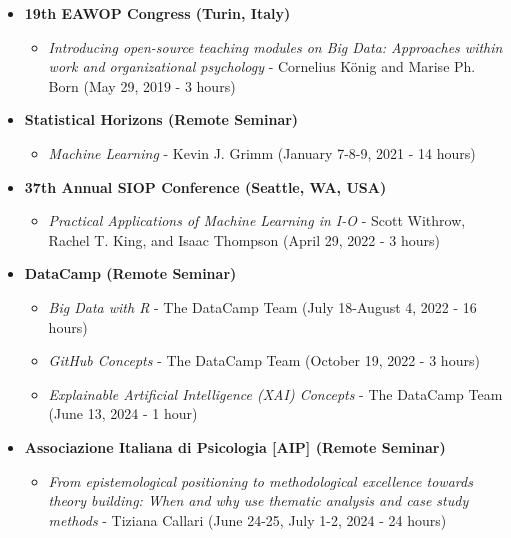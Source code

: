 \documentclass[hidelinks, letterpaper,10pt]{article} %
\begin{document}
\begin{itemize}
\item \textbf{19th EAWOP Congress (Turin, Italy)} \\
   \begin{itemize}
    \item \textit{Introducing open-source teaching modules on Big Data: Approaches within work and organizational psychology} - Cornelius König and Marise Ph. Born (May 29, 2019 - 3 hours) \\
    \end{itemize}

\item \textbf{Statistical Horizons (Remote Seminar)} \\
    \begin{itemize}
    \item \textit{Machine Learning} - Kevin J. Grimm (January 7-8-9, 2021 - 14 hours) \\
    \end{itemize}

\item \textbf{37th Annual SIOP Conference (Seattle, WA, USA)} \\
   \begin{itemize}
    \item \textit{Practical Applications of Machine Learning in I-O} - Scott Withrow, Rachel T. King, and Isaac Thompson (April 29, 2022 - 3 hours) \\
    \end{itemize}
    
\item \textbf{DataCamp (Remote Seminar)} \\
    \begin{itemize}
    \item \textit{Big Data with R} - The DataCamp Team (July 18-August 4, 2022 - 16 hours) \\
    \item \textit{GitHub Concepts} - The DataCamp Team (October 19, 2022 - 3 hours) \\
    \item \textit{Explainable Artificial Intelligence (XAI) Concepts} - The DataCamp Team (June 13, 2024 - 1 hour)
    \end{itemize}
    
\item \textbf{Associazione Italiana di Psicologia [AIP] (Remote Seminar)} \\
    \begin{itemize}
    \item \textit{From epistemological positioning to methodological excellence towards theory building: When and why use thematic analysis and case study methods} - Tiziana Callari (June 24-25, July 1-2, 2024 - 24 hours) 
    \end{itemize}

\end{itemize}
\end{document}
